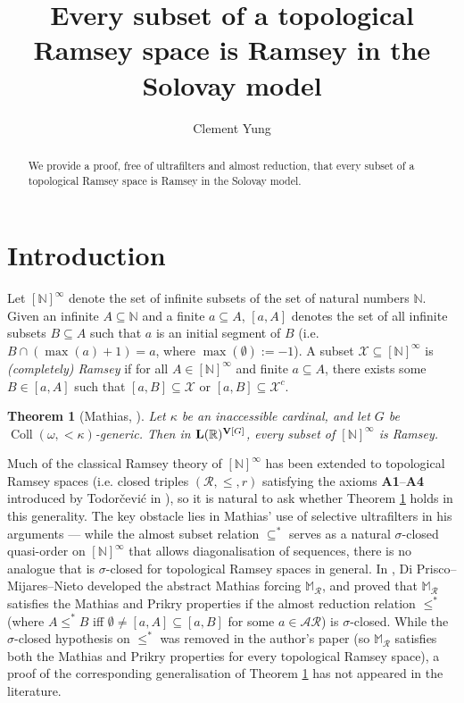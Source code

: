 \documentclass[11pt,reqno]{amsart}
\title[Every set is Ramsey in the Solovay model]{Every subset of a topological Ramsey space is Ramsey in the Solovay model}
\author{Clement Yung}
\theoremstyle{plain}
\numberwithin{equation}{section}
\newtheorem{theorem}{Theorem}[section]
\theoremstyle{definition}
\newcommand{\func}{\operatorname}
\newcommand{\R}{\mathbb{R}}
\newcommand{\N}{\mathbb{N}}
\newcommand{\cal}{\mathcal}
\renewcommand{\bf}{\mathbf}
\newcommand{\Coll}{\func{Coll}}
\newcommand{\V}{\bf{V}}
\newcommand{\X}{\cal{X}}
\DeclareRobustCommand{\L}{\ifmmode\mathbf{L}\else\strokeL\fi}
\begin{document}
\begin{abstract}
    We provide a proof, free of ultrafilters and almost reduction, that every subset of a topological Ramsey space is Ramsey in the Solovay model.
\end{abstract}

\maketitle

\section{Introduction}
\label{sec:intro}
Let $[\N]^\infty$ denote the set of infinite subsets of the set of natural numbers $\N$. Given an infinite $A \subseteq \N$ and a finite $a \subseteq A$, $[a,A]$ denotes the set of all infinite subsets $B \subseteq A$ such that $a$ is an initial segment of $B$ (i.e. $B \cap (\max(a) + 1) = a$, where $\max(\emptyset) := -1$). A subset $\X \subseteq [\N]^\infty$ is \emph{(completely) Ramsey} if for all $A \in [\N]^\infty$ and finite $a \subseteq A$, there exists some $B \in [a,A]$ such that $[a,B] \subseteq \X$ or $[a,B] \subseteq \X^c$. 

\begin{theorem}[Mathias, \cite{M77}]
\label{thm:Mathias}
    Let $\kappa$ be an inaccessible cardinal, and let $G$ be $\Coll(\omega,{<}\kappa)$-generic. Then in $\L(\R)^{\V[G]}$, every subset of $[\N]^\infty$ is Ramsey.
\end{theorem}

Much of the classical Ramsey theory of $[\N]^\infty$ has been extended to topological Ramsey spaces (i.e. closed triples $(\cal{R},\leq,r)$ satisfying the axioms \textbf{A1}--\textbf{A4} introduced by Todor\v{c}evi\'{c} in \cite{T10}), so it is natural to ask whether Theorem \ref{thm:Mathias} holds in this generality. The key obstacle lies in Mathias' use of selective ultrafilters in his arguments --- while the almost subset relation $\subseteq^*$ serves as a natural $\sigma$-closed quasi-order on $[\N]^\infty$ that allows diagonalisation of sequences, there is no analogue that is $\sigma$-closed for topological Ramsey spaces in general. In \cite{DMN15}, Di Prisco--Mijares--Nieto developed the abstract Mathias forcing $\mathbb{M}_\cal{R}$, and proved that $\mathbb{M}_\cal{R}$ satisfies the Mathias and Prikry properties if the almost reduction relation $\leq^*$ (where $A \leq^*B$ iff $\emptyset \neq [a,A] \subseteq [a,B]$ for some $a \in \cal{AR}$) is $\sigma$-closed. While the $\sigma$-closed hypothesis on $\leq^*$ was removed in the author's paper \cite{Y25} (so $\mathbb{M}_\cal{R}$ satisfies both the Mathias and Prikry properties for every topological Ramsey space), a proof of the corresponding generalisation of Theorem \ref{thm:Mathias} has not appeared in the literature.
\end{document}
